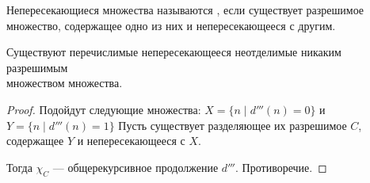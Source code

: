 \begin{defn}
	Непересекающиеся множества называются , если существует разрешимое\\
	множество, содержащее одно из них и непересекающееся с другим.
\end{defn}

\begin{cor}\label{cor:separator}
    Существуют перечислимые непересекающееся неотделимые никаким разрешимым\\
    множеством множества. 
\end{cor}
\begin{proof}
	Подойдут следующие множества:
	$ X = \{ n \mid d'''(n) = 0\}$ и  $ Y = \{n \mid d'''(n) =1 \}$
Пусть существует разделяющее их разрешимое $ C$, содержащее $ Y$ и непересекающееся с $ X$.

Тогда $ \chi_C$ --- общерекурсивное продолжение $ d'''$.  Противоречие. 
\end{proof}



